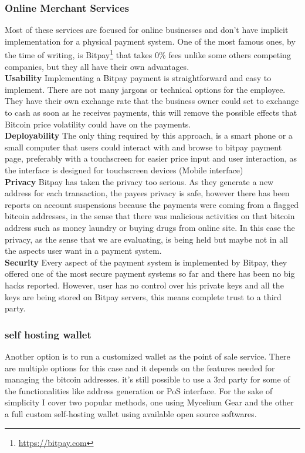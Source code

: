 \subsubsection{Online Merchant Services}
Most of these services are focused for online businesses and don't have implicit implementation for a physical payment system. 
One of the most famous ones, by the time of writing, is Bitpay\footnote{\url{https://bitpay.com}} that takes 0\% fees unlike some others competing companies, but they all have their own advantages.
\\ \textbf{Usability}
Implementing a Bitpay payment is straightforward and easy to implement. There are not many jargons or technical options for the employee. They have their own exchange rate that the business owner could set to exchange to cash as soon as he receives payments, this will remove the possible effects that Bitcoin price volatility could have on the payments.
\\ \textbf{Deployability}
The only thing required by this approach, is a smart phone or a small computer that users could interact with and browse to bitpay payment page, preferably with a touchscreen for easier price input and user interaction, as the interface is designed for touchscreen devices (Mobile interface)
\\ \textbf{Privacy}
Bitpay has taken the privacy too serious. As they generate a new address for each transaction, the payees privacy is safe, however there has been reports on account suspensions because the payments were coming from a flagged bitcoin addresses, in the sense that there was malicious activities on that bitcoin address such as money laundry or buying drugs from online site. In this case the privacy, as the sense that we are evaluating, is being held but maybe not in all the aspects user want in a payment system.
\\ \textbf{Security}
Every aspect of the payment system is implemented by Bitpay, they offered one of the most secure payment systems so far and there has been no big hacks reported. However, user has no control over his private keys and all the keys are being stored on Bitpay servers, this means complete trust to a third party.



\subsubsection{self hosting wallet}
Another option is to run a customized wallet as the point of sale service. There are multiple options for this case and it depends on the features needed for managing the bitcoin addresses. it's still possible to use a 3rd party for some of the functionalities like address generation or PoS interface. For the sake of simplicity I cover two popular methods, one using Mycelium Gear and the other a full custom self-hosting wallet using available open source softwares.


